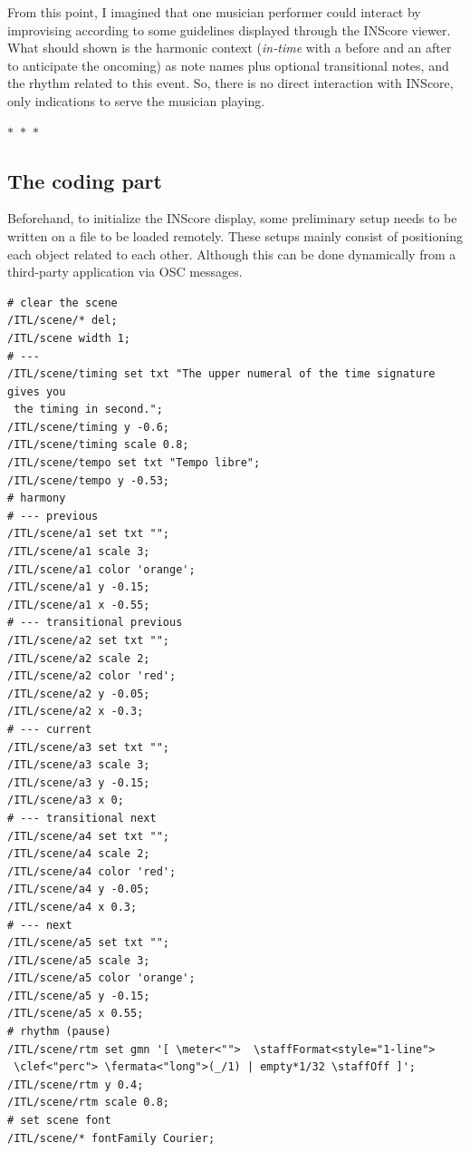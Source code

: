 \documentclass{article}
\begin{document}
From this point, I imagined that one musician performer could interact by improvising according to some guidelines displayed through the INScore viewer.%
 What should shown is the harmonic context (\textit{in-time} with a before and an after to anticipate the oncoming) as note names plus optional transitional notes, and the rhythm related to this event. So, there is no direct interaction with INScore, only indications to serve the musician playing. 

\begin{center}
  $\ast$~$\ast$~$\ast$
\end{center}

\subsection*{The coding part}
 

Beforehand, to initialize the INScore display, some preliminary setup needs to be written on a file to be loaded remotely. These setups mainly consist of positioning each object related to each other. Although this can be done dynamically from a third-party application via OSC messages.

\begin{lstlisting}[language=inscore]
# clear the scene
/ITL/scene/* del;
/ITL/scene width 1;
# ---
/ITL/scene/timing set txt "The upper numeral of the time signature gives you
 the timing in second."; 
/ITL/scene/timing y -0.6;
/ITL/scene/timing scale 0.8;
/ITL/scene/tempo set txt "Tempo libre"; 
/ITL/scene/tempo y -0.53;
# harmony
# --- previous
/ITL/scene/a1 set txt "";
/ITL/scene/a1 scale 3;
/ITL/scene/a1 color 'orange';
/ITL/scene/a1 y -0.15;
/ITL/scene/a1 x -0.55;
# --- transitional previous
/ITL/scene/a2 set txt "";
/ITL/scene/a2 scale 2;
/ITL/scene/a2 color 'red';
/ITL/scene/a2 y -0.05;
/ITL/scene/a2 x -0.3;
# --- current
/ITL/scene/a3 set txt "";
/ITL/scene/a3 scale 3;
/ITL/scene/a3 y -0.15;
/ITL/scene/a3 x 0;
# --- transitional next
/ITL/scene/a4 set txt "";
/ITL/scene/a4 scale 2;
/ITL/scene/a4 color 'red';
/ITL/scene/a4 y -0.05;
/ITL/scene/a4 x 0.3;
# --- next
/ITL/scene/a5 set txt "";
/ITL/scene/a5 scale 3;
/ITL/scene/a5 color 'orange';
/ITL/scene/a5 y -0.15;
/ITL/scene/a5 x 0.55;
# rhythm (pause)
/ITL/scene/rtm set gmn '[ \meter<"">  \staffFormat<style="1-line"> 
 \clef<"perc"> \fermata<"long">(_/1) | empty*1/32 \staffOff ]';
/ITL/scene/rtm y 0.4;
/ITL/scene/rtm scale 0.8;
# set scene font
/ITL/scene/* fontFamily Courier;
\end{lstlisting}
\end{document}
